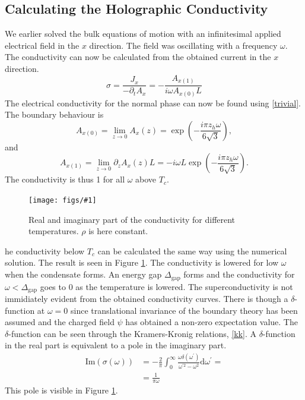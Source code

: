 \documentclass[12pt]{report}
\renewcommand{\d}{\ensuremath{\mathrm{d}}}
\renewcommand{\i}{\ensuremath{i}}
\newcommand{\im}{\ensuremath{\mathrm{Im}}}
\newcommand{\fig}[3]{
\begin{figure}
\centering
\texttt{[image: figs/\#1]}
\caption{#2}
\end{figure}
}
\begin{document}
\subsection{Calculating the Holographic Conductivity}
We earlier solved the bulk equations of motion with an infinitesimal applied electrical field in the $x$ direction. The field was oscillating with a frequency $\omega$. The conductivity can now be calculated from the obtained current in the $x$ direction.
\begin{equation}
 \sigma=\frac{J_x}{-\partial_tA_x}=-\frac{A_{x(1)}}{\i\omega A_{x(0)}L}
\end{equation}
The electrical conductivity for the normal phase can now be found using \eqref{trivial}. The boundary behaviour is
\begin{equation}
    A_{x(0)}=\lim_{z\rightarrow0} A_x(z) =  \exp\left(-\frac{\i\pi z_h\omega}{6\sqrt{3}}\right),                                                                                 
\end{equation}
and
\begin{equation}
    A_{x(1)}=\lim_{z\rightarrow0} \partial_zA_x(z)L   = -\i\omega L\exp\left(-\frac{\i\pi z_h\omega}{6\sqrt{3}}\right).      
\end{equation}
The conductivity is thus 1 for all $\omega$ above $T_c$.\\

\fig{cond_Ts_a2_0.0_v2.pdf}{Real and imaginary part of the conductivity for different temperatures. $\rho$ is here constant.\label{f:cond}}

The conductivity below $T_c$ can be calculated the same way using the numerical solution. The result is seen in Figure \ref{f:cond}. The conductivity is lowered for low $\omega$ when the condensate forms. An energy gap $\Delta_\mathrm{gap}$ forms and the conductivity for $\omega<\Delta_\mathrm{gap}$ goes to 0 as the temperature is lowered. The superconductivity is not immidiately evident from the obtained conductivity curves. There is though a $\delta$-function at $\omega=0$ since translational invariance of the boundary theory has been assumed and the charged field $\psi$ has obtained a non-zero expectation value. The $\delta$-function can be seen through the Kramers-Kronig relations, \eqref{kk}. A $\delta$-function in the real part is equivalent to a pole in the imaginary part.
\begin{equation}
\begin{split}
\im(\sigma(\omega))&=-\frac{2}{\pi}\int_0^\infty\frac{\omega\delta(\omega^\prime)}{\omega^{\prime 2}-\omega^2}\d \omega^\prime=\\
&=\frac{1}{\pi\omega}
\end{split}
\end{equation}
This pole is visible in Figure \ref{f:cond}.
\end{document}

